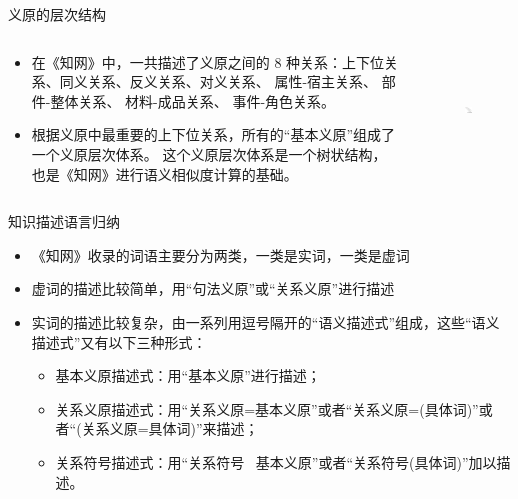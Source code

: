 \documentclass[aspectratio=169]{beamer} %
\begin{document}
    \begin{frame}{义原的层次结构}
      \begin{columns}
      \begin{column}[t]{0.6\textwidth}
        \begin{itemize}
        \item 在《知网》中，一共描述了义原之间的 8 种关系：上下位关系、同义关系、反义关系、对义关系、 属性-宿主关系、 部件-整体关系、 材料-成品关系、 事件-角色关系。
        \item 根据义原中最重要的上下位关系，所有的“基本义原”组成了一个义原层次体系。
这个义原层次体系是一个树状结构， 也是《知网》进行语义相似度计算的基础。
      \end{itemize}
      \end{column}

      \begin{column}[t]{0.4\textwidth}
        \begin{figure}
      \includegraphics[width=1.6in,height=1.2in]{hownet2.png}
      \end{figure}
      \end{column}

      \end{columns}
      
    \end{frame}

    \begin{frame}{知识描述语言归纳}
      \begin{itemize}
        \item 《知网》收录的词语主要分为两类，一类是实词，一类是虚词
        \item 虚词的描述比较简单，用“句法义原”或“关系义原”进行描述
        \item 实词的描述比较复杂，由一系列用逗号隔开的“语义描述式”组成，这些“语义描述式”又有以下三种形式：
          \begin{itemize}
            \item 基本义原描述式：用“基本义原”进行描述；
            \item 关系义原描述式：用“关系义原=基本义原”或者“关系义原=(具体词)”或者“(关系义原=具体词)”来描述；
            \item 关系符号描述式：用“关系符号 \ 基本义原”或者“关系符号(具体词)”加以描述。
          \end{itemize}
      \end{itemize}
    \end{frame}
\end{document}
